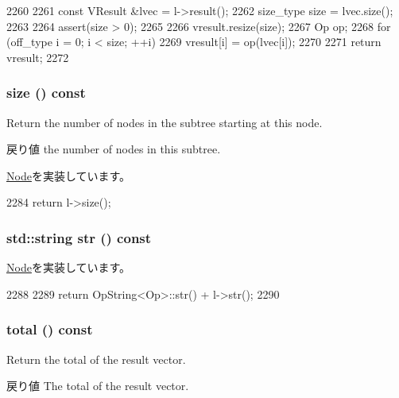 \begin{DoxyCode}
2260     {
2261         const VResult &lvec = l->result();
2262         size_type size = lvec.size();
2263 
2264         assert(size > 0);
2265 
2266         vresult.resize(size);
2267         Op op;
2268         for (off_type i = 0; i < size; ++i)
2269             vresult[i] = op(lvec[i]);
2270 
2271         return vresult;
2272     }
\end{DoxyCode}
\hypertarget{classStats_1_1UnaryNode_a503ab01f6c0142145d3434f6924714e7}{
\subsubsection[{size}]{ size () const}}
\label{classStats_1_1UnaryNode_a503ab01f6c0142145d3434f6924714e7}
Return the number of nodes in the subtree starting at this node. \begin{DoxyReturn}{戻り値}
the number of nodes in this subtree. 
\end{DoxyReturn}


\hyperlink{classStats_1_1Node_a4051d143efd31726fa13df03ae4e1bce}{Node}を実装しています。


\begin{DoxyCode}
2284 { return l->size(); }
\end{DoxyCode}
\hypertarget{classStats_1_1UnaryNode_a1b9b8885b0880fc4ddf9a2c7d1ca3dc4}{
\subsubsection[{str}]{\setlength{\rightskip}{0pt plus 5cm}std::string str () const}}
\label{classStats_1_1UnaryNode_a1b9b8885b0880fc4ddf9a2c7d1ca3dc4}


\hyperlink{classStats_1_1Node_a6522bc65bd97a6b1ef6cdfe78462a919}{Node}を実装しています。


\begin{DoxyCode}
2288     {
2289         return OpString<Op>::str() + l->str();
2290     }
\end{DoxyCode}
\hypertarget{classStats_1_1UnaryNode_a35c6e2ed3fc81b40d69052a062113ead}{
\subsubsection[{total}]{ total () const}}
\label{classStats_1_1UnaryNode_a35c6e2ed3fc81b40d69052a062113ead}
Return the total of the result vector. \begin{DoxyReturn}{戻り値}
The total of the result vector. 
\end{DoxyReturn}


